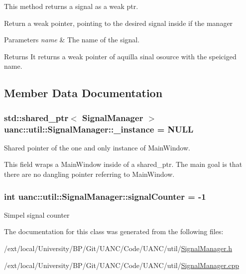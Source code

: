 This method returns a signal as a weak ptr. 

Return a weak pointer, pointing to the desired signal inside if the manager


\begin{DoxyParams}{Parameters}
{\em name} & The name of the signal.\\
\hline
\end{DoxyParams}
\begin{DoxyReturn}{Returns}
It returns a weak pointer of aquilla sinal osource with the speiciged name. 
\end{DoxyReturn}


\subsection{Member Data Documentation}
\subsubsection[{\texorpdfstring{\+\_\+instance}{_instance}}]{\setlength{\rightskip}{0pt plus 5cm}std\+::shared\+\_\+ptr$<$ {\bf Signal\+Manager} $>$ uanc\+::util\+::\+Signal\+Manager\+::\+\_\+instance = N\+U\+LL\hspace{0.3cm}{\ttfamily [static]}}\hypertarget{classuanc_1_1util_1_1_signal_manager_a44536c4ffe270bbba74fac4289017399}{}\label{classuanc_1_1util_1_1_signal_manager_a44536c4ffe270bbba74fac4289017399}


Shared pointer of the one and only instance of Main\+Window. 

This field wraps a Main\+Window inside of a shared\+\_\+ptr. The main goal is that there are no dangling pointer referring to Main\+Window. 
\subsubsection[{\texorpdfstring{signal\+Counter}{signalCounter}}]{\setlength{\rightskip}{0pt plus 5cm}int uanc\+::util\+::\+Signal\+Manager\+::signal\+Counter = -\/1}\hypertarget{classuanc_1_1util_1_1_signal_manager_a8f433e771d5933242b75e35397078ecb}{}\label{classuanc_1_1util_1_1_signal_manager_a8f433e771d5933242b75e35397078ecb}
Simpel signal counter 

The documentation for this class was generated from the following files\+:\begin{DoxyCompactItemize}
\item 
/ext/local/\+University/\+B\+P/\+Git/\+U\+A\+N\+C/\+Code/\+U\+A\+N\+C/util/\hyperlink{_signal_manager_8h}{Signal\+Manager.\+h}\item 
/ext/local/\+University/\+B\+P/\+Git/\+U\+A\+N\+C/\+Code/\+U\+A\+N\+C/util/\hyperlink{_signal_manager_8cpp}{Signal\+Manager.\+cpp}\end{DoxyCompactItemize}
